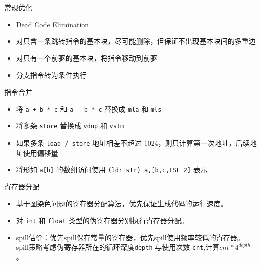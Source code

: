 \documentclass[aspectratio=169,UTF-8]{ctexbeamer}
\begin{document}
		\begin{frame}{常规优化}
			\begin{itemize}
				\item Dead Code Elimination
				\item 对只含一条跳转指令的基本块，尽可能删除，但保证不出现基本块间的多重边
				\item 对只有一个前驱的基本块，将指令移动到前驱
				\item 分支指令转为条件执行
			\end{itemize}
		\end{frame}
		
		\begin{frame}{指令合并}
		
			\begin{itemize}
				\item 将 \lstinline{a + b * c} 和 \lstinline{a - b * c} 替换成 \lstinline{mla} 和 \lstinline{mls}
				\item 将多条 \lstinline{store} 替换成 \lstinline{vdup} 和 \lstinline{vstm}
				\item 如果多条 \lstinline{load / store} 地址相差不超过 1024，则只计算第一次地址，后续地址使用偏移量
				\item 将形如 \lstinline{a[b]} 的数组访问使用 \lstinline{(ldr|str) a,[b,c,LSL 2]} 表示
			\end{itemize}
		\end{frame}
		
		\begin{frame}{寄存器分配}
			\begin{itemize}
				\item 基于图染色问题的寄存器分配算法，优先保证生成代码的运行速度。
				\item 对 \lstinline{int} 和 \lstinline{float} 类型的伪寄存器分别执行寄存器分配。
				\item spill估价：优先spill保存常量的寄存器，优先spill使用频率较低的寄存器。
				spill策略考虑伪寄存器所在的循环深度\lstinline{depth} 与使用次数 \lstinline{cnt},计算$cnt * 4^{depth}$。
				\end{itemize}
		\end{frame}
	
\end{document}
